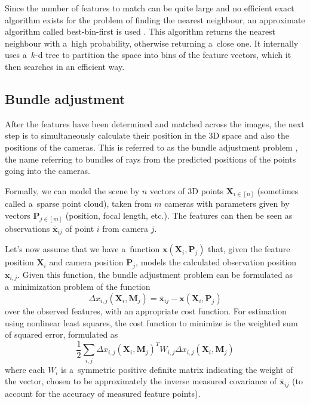 Since the number of features to match can be quite large and no efficient exact algorithm exists for the problem of finding the nearest neighbour, an approximate algorithm called best-bin-first is used \cite{beis1997shape}.
This algorithm returns the nearest neighbour with a~high probability, otherwise returning a~close one.
It internally uses a~$k$-d tree to partition the space into bins of the feature vectors, which it then searches in an efficient way.

\subsection{Bundle adjustment}
After the features have been determined and matched across the images, the next step is to simultaneously calculate their position in the 3D space and also the positions of the cameras.
This is referred to as the bundle adjustment problem \cite{triggs1999bundle}, the name referring to bundles of rays from the predicted positions of the points going into the cameras.

Formally, we can model the scene by $n$ vectors of 3D points $\mathbf{X}_{i \in [n]}$ (sometimes called a~sparse point cloud), taken from $m$ cameras with parameters given by vectors $\mathbf{P}_{j \in [m]}$ (position, focal length, etc.).
The features can then be seen as observations $\overline{\bm{x}}_{ij}$ of point $i$ from camera $j$.

Let's now assume that we have a~function $\bm{x}(\mathbf{X}_i, \mathbf{P}_j)$ that, given the feature position $\mathbf{X}_i$ and camera position $\mathbf{P}_j$, models the calculated observation position $\mathbf{x}_{i, j}$.
Given this function, the bundle adjustment problem can be formulated as a~minimization problem of the function \begin{equation} \Delta x_{i, j} (\mathbf{X}_i, \mathbf{M}_j) = \overline{\bm{x}}_{ij} - \bm{x}(\mathbf{X}_i, \mathbf{P}_j) \end{equation} over the observed features, with an appropriate cost function. For estimation using nonlinear least squares, the cost function to minimize is the weighted sum of squared error, formulated as 
\begin{equation} \frac{1}{2} \sum_{i,j} \Delta x_{i, j} (\mathbf{X}_i, \mathbf{M}_j)^T W_{i,j} \Delta x_{i, j} (\mathbf{X}_i, \mathbf{M}_j) \end{equation}
where each $W_i$ is a~symmetric positive definite matrix indicating the weight of the vector, chosen to be approximately the inverse measured covariance of $\overline{\bm{x}}_{ij}$ (to account for the accuracy of measured feature points).

